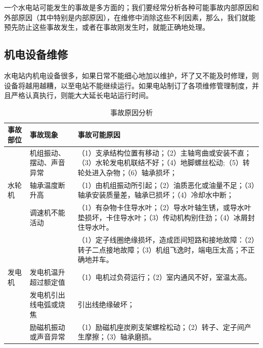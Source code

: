 \documentclass{ctexbook}
\begin{document}
一个水电站可能发生的事故是多方面的；我们要经常分析各种可能事故内部原因和外部原因（其中特别是内部原因），在维修中消除这些不利因素，那么，我们就能预先防止这些事故发生，或者在事故刚发生时，就能正确地处理。
\subsection{机电设备维修}
水电站内机电设备很多，如果日常不能细心地加以维护，坏了又不能及时修理，则设备将越用越糟，以至电站不能继续运行。如果电站制订了各项维修管理制度，并且严格认真执行，则能大大延长电站运行时间。

\begin{table}[htbp]
	\centering
	\caption{事故原因分析}
	\begin{tabular}{l|l|p{80em}}
		\hline
		事故部位&事故现象& \multicolumn{1}{l}{事故可能原因}\\ \hline
		&机组振动、摆动、声音异常 &（1）支承结构位置有移动；\newline{}（2）主轴弯曲或安装不直；\newline{}（3）水轮发电机联结不好；\newline{}（4）地脚螺丝松动;\newline{}（5）转轮处进入杂物；\newline{}（6）轴承损坏；\\ \hline
		水轮机&轴承温度断升高&（1）由机组振动所引起；\newline{}（2）油质恶化或油量不足；\newline{}（3）轴承安装质量差，轴承已损坏；\newline{}（4）冷却水中断；\\ \hline
		&调速机不能活动&（1）有杂物卡住导水叶；\newline{}（2）导水叶轴生锈，或导水叶垫损坏，卡住导水叶；\newline{}（3）传动机构别住劲；\newline{}（4）冰屑封住导水叶。\\ \hline
		& &（1）定子线圈绝缘损坏，造成匝间短路和接地故障：\newline{}（2）转子二点接地故障；\newline{}（3）机组飞逸时，端电压太高；不正确地并车。\\ \hline
		发电机&发电机温升超过额定值&（1）电机过负荷运行；\newline{}（2）室内通风不好，室温太高。\\ \hline
		&发电机引出线电弧或烧焦&引出线绝缘破坏；\\ \hline
		&励磁机振动或声音异常&（1）励磁机座炭刷支架螺栓松动；\newline{}（2）转子、定子间产生摩擦；\newline{}（3）轴承磨损。\\ \hline

\end{tabular}
\end{table}
\end{document}
